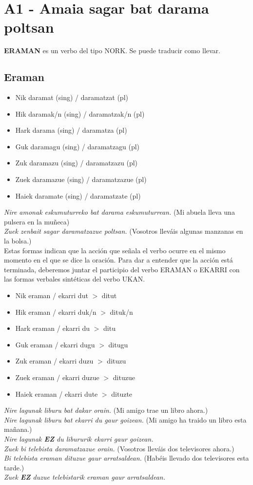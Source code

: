 \documentclass[11pt, a4paper]{article}
\begin{document}
\section{A1 - Amaia sagar bat darama poltsan}
\noindent \textbf{ERAMAN} es un verbo del tipo NORK. Se puede traducir como llevar.

\subsection{Eraman}
\begin{itemize}
\item Nik daramat (sing) / daramatzat (pl)
\item Hik daramak/n (sing) / daramatzak/n (pl)
\item Hark darama (sing) / daramatza (pl)
\item Guk daramagu (sing) / daramatzagu (pl)
\item Zuk daramazu (sing) / daramatzazu (pl)
\item Zuek daramazue (sing) / daramatzazue (pl)
\item Haiek daramate (sing) / daramatzate (pl)
\end{itemize}
\indent \indent \textit{Nire amonak eskumuturreko bat darama eskumuturrean.} (Mi abuela lleva una pulsera en la muñeca)\\
\indent \textit{Zuek zenbait sagar daramatzazue poltsan.} (Vosotros lleváis algunas manzanas en la bolsa.)\\

\noindent Estas formas indican que la acción que señala el verbo ocurre en el mismo momento en el que se dice la oración. Para dar a entender que la acción está terminada, deberemos juntar el participio del verbo ERAMAN o EKARRI con las formas verbales sintéticas del verbo UKAN.
\begin{itemize}
\item Nik eraman / ekarri dut $>$ ditut
\item Hik eraman / ekarri duk/n $>$ dituk/n
\item Hark eraman / ekarri du $>$ ditu
\item Guk eraman / ekarri dugu $>$ ditugu
\item Zuk eraman / ekarri duzu $>$ dituzu
\item Zuek eraman / ekarri duzue $>$ dituzue
\item Haiek eraman / ekarri dute $>$ dituzte
\end{itemize}
\indent \indent \textit{Nire lagunak liburu bat dakar orain.} (Mi amigo trae un libro ahora.)\\
\indent \textit{Nire lagunak liburu bat ekarri du gaur goizean.} (Mi amigo ha traido un libro esta mañana.)\\
\indent \textit{Nire lagunak \textbf{EZ} du libururik ekarri gaur goizean.}\\
\indent \textit{Zuek bi telebista daramatzazue orain.}
(Vosotros lleváis dos televisores ahora.)\\
\indent \textit{Bi telebista eraman dituzue gaur arratsaldean.} (Habéis llevado dos televisores esta tarde.)\\
\indent \textit{Zuek \textbf{EZ} duzue telebistarik eraman gaur arratsaldean.}
\end{document}
